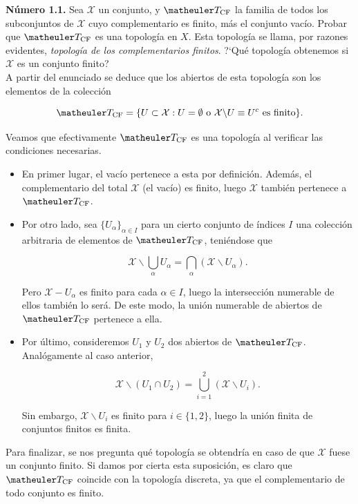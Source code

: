 
\textbf{Número 1.1.} Sea $\mathcal{X}$ un conjunto, y $\T_{\text{CF}}$ la familia de todos los subconjuntos de $\mathcal{X}$ cuyo complementario es finito, más el conjunto vacío. Probar que $\T_{\text{CF}}$ es una topología en $X$. Esta topología se llama, por razones evidentes, \textit{topología de los complementarios finitos}. ?`Qué topología obtenemos si $\mathcal{X}$ es un conjunto finito?  \\

A partir del enunciado se deduce que los abiertos de esta topología son los elementos de la colección 

\[\T_{\text{CF}}= \{U \subset \mathcal{X} : U= \emptyset \text{ o } \mathcal{X} \backslash U\equiv U^c \text{ es finito}\}.\]

Veamos que efectivamente $\T_{\text{CF}}$ es una topología al verificar las condiciones necesarias. 

\begin{itemize}
\item En primer lugar, el vacío pertenece a esta por definición. Además, el complementario del total $\mathcal{X}$ (el vacío) es finito, luego $\mathcal{X}$ también pertenece a $\T_{\text{CF}}$. 

\item Por otro lado, sea $\{U_\alpha\}_{\alpha \in I}$ para un cierto conjunto de índices $I$ una colección arbitraria de elementos de $\T_{\text{CF}}$, teniéndose que 

\[\mathcal{X} \backslash \bigcup_{\alpha}U_\alpha = \bigcap_{\alpha} (\mathcal{X}\backslash U_\alpha).\]

Pero $\mathcal{X}-U_\alpha$ es finito para cada $\alpha \in I$, luego la intersección numerable de ellos también lo será. De este modo, la unión numerable de abiertos de $\T_{\text{CF}}$ pertenece a ella.

\item Por último, consideremos $U_1$ y $U_2$ dos abiertos de $\T_{\text{CF}}$. Analógamente al caso anterior, 

\[\mathcal{X} \backslash (U_1 \cap U_2) = \bigcup_{i=1}^2 (\mathcal{X}\backslash U_i).\]

Sin embargo, $\mathcal{X} \backslash U_i$ es finito para $i\in\{1,2\}$, luego la unión finita de conjuntos finitos es finita.
\end{itemize}

Para finalizar, se nos pregunta qué topología se obtendría en caso de que $\mathcal{X}$ fuese un conjunto finito. Si damos por cierta esta suposición, es claro que $\T_{\text{CF}}$ coincide con la topología discreta, ya que el complementario de todo conjunto es finito. \\

